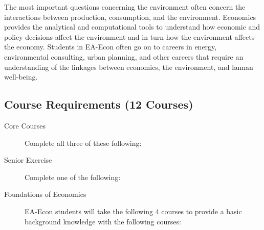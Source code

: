 \documentclass{article}\usepackage[]{graphicx}\usepackage[]{xcolor}
\newenvironment{itemize*}%
  {\begin{itemize}%
    \setlength{\itemsep}{0pt}%
    \setlength{\parskip}{0pt}}%
  {\end{itemize}}
\begin{document}
The most important questions concerning the environment often concern the interactions between production, consumption, and the environment.  Economics provides the analytical and computational tools to understand how economic and policy decisions affect the environment and in turn how the environment affects the economy.  Students in EA-Econ often go on to careers in energy, environmental consulting, urban planning, and other careers that require an understanding of the linkages between economics, the environment, and human well-being.

\subsection{Course Requirements (12 Courses)}

\begin{description}

  \item[Core Courses] Complete all three of these following:
  

  \item[Senior Exercise] Complete one of the following:
  



\item[Foundations of Economics] EA-Econ students will take the following 4 courses to provide a basic background knowledge with the following courses:




\end{description}
\end{document}
